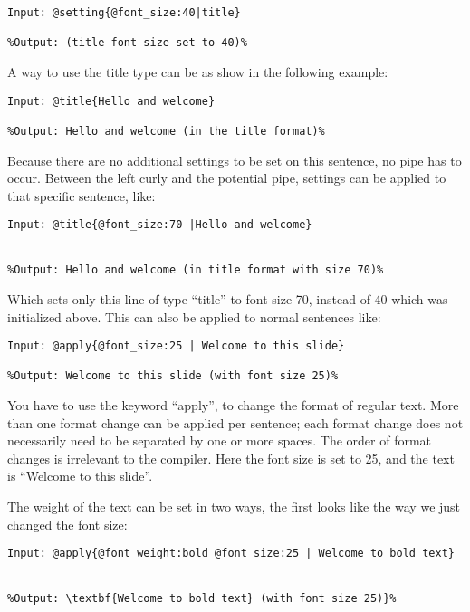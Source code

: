 \begin{lstlisting}[frame=single]
Input: @setting{@font_size:40|title}

%Output: (title font size set to 40)%
\end{lstlisting}

A way to use the title type can be as show in the following example: \\

\begin{lstlisting}[frame=single]
Input: @title{Hello and welcome}

%Output: Hello and welcome (in the title format)%
\end{lstlisting}

Because there are no additional settings to be set on this sentence, no pipe has to occur. Between the left curly and the potential pipe, settings can be applied to that specific sentence, like: \\

\begin{lstlisting}[frame=single]
Input: @title{@font_size:70 |Hello and welcome}


%Output: Hello and welcome (in title format with size 70)%
\end{lstlisting}
Which sets only this line of type ``title'' to font size 70, instead of 40 which was initialized above.
This can also be applied to normal sentences like:\\

\begin{lstlisting}[frame=single]
Input: @apply{@font_size:25 | Welcome to this slide}

%Output: Welcome to this slide (with font size 25)%
\end{lstlisting}
You have to use the keyword ``apply'', to change the format of regular text. More than one format change can be applied per sentence; each format change does not necessarily need to be separated by one or more spaces. The order of format changes is irrelevant to the compiler. Here the font size is set to 25, and the text is ``Welcome to this slide''.

The weight of the text can be set in two ways, the first looks like the way we just changed the font size: \\

\begin{lstlisting}[frame=single]
Input: @apply{@font_weight:bold @font_size:25 | Welcome to bold text}


%Output: \textbf{Welcome to bold text} (with font size 25)}%
\end{lstlisting}

